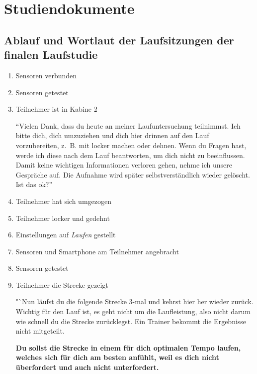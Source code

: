 

\chapter{Studiendokumente} 

\label{cha:studiendokumente}

\section{Ablauf und Wortlaut der Laufsitzungen der finalen Laufstudie} 

\label{sec:ablauf_und_wortlaut_der_laufsitzungen_der_finalen_laufstudie} 
\begin{enumerate}
	\item Sensoren verbunden 
	\item Sensoren getestet 
	\item Teilnehmer ist in Kabine 2
	
	"`Vielen Dank, dass du heute an meiner Laufuntersuchung teilnimmst. Ich bitte dich, dich umzuziehen und dich hier drinnen auf den Lauf vorzubereiten, z.~B. mit locker machen oder dehnen. Wenn du Fragen hast, werde ich diese nach dem Lauf beantworten, um dich nicht zu beeinflussen. Damit keine wichtigen Informationen verloren gehen, nehme ich unsere Gespräche auf. Die Aufnahme wird später selbstverständlich wieder gelöscht. Ist das ok?"'
	
	\item Teilnehmer hat sich umgezogen 
	\item Teilnehmer locker und gedehnt
	
	\item Einstellungen auf \emph{Laufen} gestellt 
	\item Sensoren und Smartphone am Teilnehmer angebracht 
	\item Sensoren getestet 
	\item Teilnehmer die Strecke gezeigt 
	
	"`Nun läufst du die folgende Strecke 3-mal und kehrst hier her wieder zurück. Wichtig für den Lauf ist, es geht nicht um die Laufleistung, also nicht darum wie schnell du die Strecke zurücklegst. Ein Trainer bekommt die Ergebnisse nicht mitgeteilt. 
	
	\textbf{Du sollst die Strecke in einem für dich optimalen Tempo laufen, welches sich für dich am besten anfühlt, weil es dich nicht überfordert und auch nicht unterfordert.}
	

\end{enumerate}
